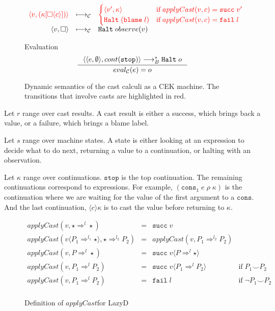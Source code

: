 \documentclass[acmsmall,review,anonymous]{acmart}\settopmatter{printfolios=true,printccs=false,printacmref=false}
\newcommand{\funrule}[3]{#1 &=& #2 & #3\\}
\newcommand{\lazyD}{Lazy\;D}
\newcommand{\sOOinspect}[3]{\langle\langle#1,#2\rangle,#3\rangle}
\newcommand{\sOOreturn}[2]{\langle#1,#2\rangle}
\newcommand{\sOOhalt}[1]{\mathtt{Halt} \; #1}
\newcommand{\cOOcast}[3]{#1 \Rightarrow^{#2} #3}
\newcommand{\oOOblame}[1]{\mathtt{blame} \; #1}
\newcommand{\vOOcast}[2]{#1\langle#2\rangle}
\newcommand{\rOOsucc}[1]{\mathtt{succ}\;#1}
\newcommand{\rOOfail}[1]{\mathtt{fail}\;#1}
\newcommand{\kOOmt}[0]{\square}
\newcommand{\kOOcast}[2]{
	#2[\square \langle #1 \rangle]}
\newcommand{\hckOOmt}[0]{\mathtt{stop}}
\newcommand{\sidecond}[1]{\text{if}\;#1}
\newcommand{\judgeCeval}[2]{eval_{\mathcal{C}}(#1) = #2}
\newcommand{\redrule}[3]{#1 & \longmapsto_\mathcal{C} & #2 & #3\\}
\newcommand{\highlight}[1]{{\color{red} #1}}
\begin{document}
\begin{figure}
\[\begin{array}{rclr}
	\redrule{
		\highlight{\sOOreturn{v}{(
				\kOOcast{c}{\kappa}
			)}}
	}{
\highlight{          
\begin{cases}
	\sOOreturn{v'}{\kappa} & \sidecond{applyCast(v,c) = \rOOsucc{v'}}
	\\
	\sOOhalt{(\oOOblame{l})} & \sidecond{applyCast(v,c) = \rOOfail{l}}
\end{cases}}
	}{}
\redrule{
\sOOreturn{v}{\kOOmt}}{
\sOOhalt{observe(v)}}{}
	\end{array}
	\]	
	
	Evaluation \fbox{$\judgeCeval{e}{o}$}
	\[
	\inference{
		\sOOinspect{e}{\emptyset}{cont(\hckOOmt)} \longrightarrow_{B}^{*} 
		\sOOhalt{o}
	}{
		\judgeCeval{e}{o}
	}
	\]
	
	\caption{Dynamic semantics of the cast calculi as a CEK
          machine. The transitions that involve casts are highlighted
          in red.}
	\label{fig:machine-cekc}
\end{figure}

Let $r$ range over cast results. A cast result is either a success, which 
brings back a value, or a failure, which brings a blame label.

Let $s$ range over machine states. A state is either looking at an 
expression to decide what to do next, returning a value to a continuation, or 
halting with an observation.

Let $\kappa$ range over continuations. $\mathtt{stop}$ is the top 
continuation. The remaining continuations correspond to expressions. For 
example, $(\mathtt{cons_1} \; e \; \rho \; \kappa)$ is the continuation where 
we are waiting for the value of the first argument to a $\mathtt{cons}$. And 
the last continuation, $\langle c \rangle \kappa$ is to cast the value before 
returning to $\kappa$.

\begin{figure}
	
	\[
	\begin{array}{rclr}
	\funrule{
		applyCast(v,\cOOcast{\star}{l}{\star})
	}{
		\rOOsucc{v}
	}{}
	\funrule{
		applyCast(\vOOcast{v}{\cOOcast{P_1}{l_1}{\star}},\cOOcast{\star}{l_2}{P_2})
	}{
		applyCast(v,\cOOcast{P_1}{l_2}{P_2})
	}{}
	\funrule{
		applyCast(v,\cOOcast{P}{l}{\star})
	}{
		\rOOsucc{\vOOcast{v}{\cOOcast{P}{l}{\star}}}
	}{}
	\funrule{
		applyCast(v,\cOOcast{P_1}{l}{P_2})
	}{
		\rOOsucc{\vOOcast{v}{\cOOcast{P_1}{l}{P_2}}}
	}{\sidecond{P_1 \smile P_2}}
	\funrule{
		applyCast(v,\cOOcast{P_1}{l}{P_2})
	}{
		\rOOfail{l}
	}{\sidecond{\neg P_1 \smile P_2}}
	
	\end{array}
	\]
	\caption{Definition of $applyCast$for \lazyD}
	\label{fig:applyCast-D-C}
\end{figure}
\end{document}
